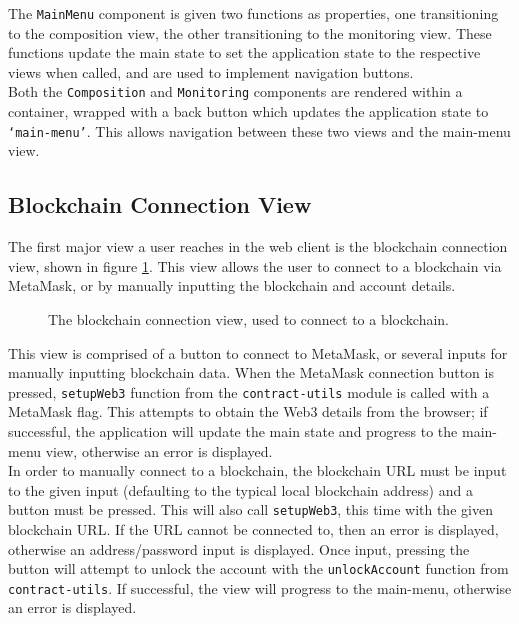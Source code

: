 The \texttt{MainMenu} component is given two functions as properties, one transitioning to the composition view, the other transitioning to the monitoring view. These functions update the main state to set the application state to the respective views when called, and are used to implement navigation buttons. \\

Both the \texttt{Composition} and \texttt{Monitoring} components are rendered within a container, wrapped with a back button which updates the application state to \texttt{`main-menu'}. This allows navigation between these two views and the main-menu view.


\subsection{Blockchain Connection View}

The first major view a user reaches in the web client is the blockchain connection view, shown in figure \ref{fig:connect}. This view allows the user to connect to a blockchain via MetaMask, or by manually inputting the blockchain and account details. \\

\begin{figure}[h]
    \centering
    \caption{The blockchain connection view, used to connect to a blockchain.}
    \label{fig:connect}
\end{figure}

This view is comprised of a button to connect to MetaMask, or several inputs for manually inputting blockchain data. When the MetaMask connection button is pressed, \texttt{setupWeb3} function from the \texttt{contract-utils} module is called with a MetaMask flag. This attempts to obtain the Web3 details from the browser; if successful, the application will update the main state and progress to the main-menu view, otherwise an error is displayed. \\

In order to manually connect to a blockchain, the blockchain URL must be input to the given input (defaulting to the typical local blockchain address) and a button must be pressed. This will also call \texttt{setupWeb3}, this time with the given blockchain URL. If the URL cannot be connected to, then an error is displayed, otherwise an address/password input is displayed. Once input, pressing the button will attempt to unlock the account with the \texttt{unlockAccount} function from \texttt{contract-utils}. If successful, the view will progress to the main-menu, otherwise an error is displayed. \\


